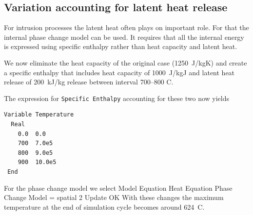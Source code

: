 \subsection{Variation accounting for latent heat release}

For intrusion processes the latent heat often plays on important role. 
For that the internal phase change model can be used. It requires that 
all the internal energy is expressed using specific enthalpy rather than
heat capacity and latent heat. 

We now eliminate the heat capacity of the original case (1250~J/kgK) and
create a specific enthalpy that includes heat capacity of 1000~J/kgJ 
and latent heat release of 200~kJ/kg release between interval 700--800 C.

The expression for \texttt{Specific Enthalpy} accounting for these two now yields
\begin{verbatim}
Variable Temperature
  Real
    0.0  0.0
    700  7.0e5
    800  9.0e5
    900  10.0e5
 End 
\end{verbatim}
For the phase change model we select 
\ttbegin
Model
  Equation
    Heat Equation
      Phase Change Model = spatial 2
  Update
  OK
\ttend        
With these changes the maximum temperature at the end of simulation cycle 
becomes around 624~C.  


\hfill
\mbox{}






